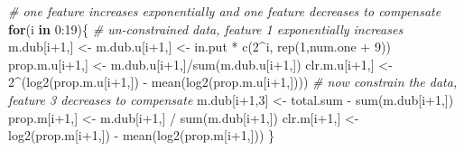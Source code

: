 \documentclass[
  onecolumn]{article}
\newenvironment{Shaded}{\begin{snugshade}}{\end{snugshade}}
\newcommand{\CommentTok}[1]{\textcolor[rgb]{0.56,0.35,0.01}{\textit{#1}}}
\newcommand{\ControlFlowTok}[1]{\textcolor[rgb]{0.13,0.29,0.53}{\textbf{#1}}}
\newcommand{\DecValTok}[1]{\textcolor[rgb]{0.00,0.00,0.81}{#1}}
\newcommand{\FunctionTok}[1]{\textcolor[rgb]{0.00,0.00,0.00}{#1}}
\newcommand{\NormalTok}[1]{#1}
\newcommand{\OtherTok}[1]{\textcolor[rgb]{0.56,0.35,0.01}{#1}}
\newcommand{\SpecialCharTok}[1]{\textcolor[rgb]{0.00,0.00,0.00}{#1}}
\begin{document}
\begin{Shaded}
\begin{Highlighting}[]
\CommentTok{\# one feature increases exponentially and one feature decreases to compensate}
\ControlFlowTok{for}\NormalTok{(i }\ControlFlowTok{in} \DecValTok{0}\SpecialCharTok{:}\DecValTok{19}\NormalTok{)\{}
    \CommentTok{\# un{-}constrained data, feature 1 exponentially increases}
\NormalTok{    m.dub[i}\SpecialCharTok{+}\DecValTok{1}\NormalTok{,] }\OtherTok{\textless{}{-}}\NormalTok{ m.dub.u[i}\SpecialCharTok{+}\DecValTok{1}\NormalTok{,] }\OtherTok{\textless{}{-}}\NormalTok{ in.put }\SpecialCharTok{*} \FunctionTok{c}\NormalTok{(}\DecValTok{2}\SpecialCharTok{\^{}}\NormalTok{i, }\FunctionTok{rep}\NormalTok{(}\DecValTok{1}\NormalTok{,num.one }\SpecialCharTok{+} \DecValTok{9}\NormalTok{))}
\NormalTok{    prop.m.u[i}\SpecialCharTok{+}\DecValTok{1}\NormalTok{,] }\OtherTok{\textless{}{-}}\NormalTok{ m.dub.u[i}\SpecialCharTok{+}\DecValTok{1}\NormalTok{,]}\SpecialCharTok{/}\FunctionTok{sum}\NormalTok{(m.dub.u[i}\SpecialCharTok{+}\DecValTok{1}\NormalTok{,])}
\NormalTok{    clr.m.u[i}\SpecialCharTok{+}\DecValTok{1}\NormalTok{,] }\OtherTok{\textless{}{-}} \DecValTok{2}\SpecialCharTok{\^{}}\NormalTok{(}\FunctionTok{log2}\NormalTok{(prop.m.u[i}\SpecialCharTok{+}\DecValTok{1}\NormalTok{,]) }\SpecialCharTok{{-}} \FunctionTok{mean}\NormalTok{(}\FunctionTok{log2}\NormalTok{(prop.m.u[i}\SpecialCharTok{+}\DecValTok{1}\NormalTok{,])))}
    \CommentTok{\# now constrain the data, feature 3 decreases to compensate}
\NormalTok{    m.dub[i}\SpecialCharTok{+}\DecValTok{1}\NormalTok{,}\DecValTok{3}\NormalTok{] }\OtherTok{\textless{}{-}}\NormalTok{ total.sum }\SpecialCharTok{{-}} \FunctionTok{sum}\NormalTok{(m.dub[i}\SpecialCharTok{+}\DecValTok{1}\NormalTok{,])}
\NormalTok{    prop.m[i}\SpecialCharTok{+}\DecValTok{1}\NormalTok{,] }\OtherTok{\textless{}{-}}\NormalTok{ m.dub[i}\SpecialCharTok{+}\DecValTok{1}\NormalTok{,] }\SpecialCharTok{/} \FunctionTok{sum}\NormalTok{(m.dub[i}\SpecialCharTok{+}\DecValTok{1}\NormalTok{,])}
\NormalTok{    clr.m[i}\SpecialCharTok{+}\DecValTok{1}\NormalTok{,] }\OtherTok{\textless{}{-}} \FunctionTok{log2}\NormalTok{(prop.m[i}\SpecialCharTok{+}\DecValTok{1}\NormalTok{,]) }\SpecialCharTok{{-}} \FunctionTok{mean}\NormalTok{(}\FunctionTok{log2}\NormalTok{(prop.m[i}\SpecialCharTok{+}\DecValTok{1}\NormalTok{,]))}
\NormalTok{\}}
\end{Highlighting}
\end{Shaded}
\end{document}
